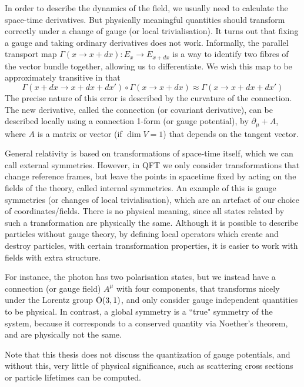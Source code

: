 In order to describe the dynamics of the field, we usually need to calculate the
space-time derivatives. But physically meaningful quantities should transform
correctly under a change of gauge (or local trivialisation). It turns out that 
fixing a gauge and taking ordinary derivatives does not work. Informally, the parallel
transport map $\Gamma(x\to x+dx) : E_x \to E_{x+dx}$ is a way to identify two
fibres of the vector bundle together, allowing us to differentiate. 
We wish this map to be approximately transitive in that 
\[
\Gamma(x+dx \to x+dx+dx') \circ \Gamma(x\to x+dx) \approx \Gamma(x\to x+dx+dx')
\] 
The precise nature of this error is described by the curvature of the
connection. The new derivative, called the connection (or covariant derivative), can be 
described locally using a connection 1-form (or gauge potential),
by $\partial_\mu+A$, where
$A$ is a matrix or vector (if $\dim V=1$) that depends on the tangent vector.

General relativity is based on
transformations of space-time itself, which we can call external symmetries.
However, in QFT we only consider transformations that change reference frames, 
but leave the points in spacetime fixed by acting on the fields of the theory, 
called internal symmetries.   
An example of this is gauge symmetries (or changes of local trivialisation),
which are an artefact of our choice of coordinates/fields. There is no
physical meaning, since all states related by such a transformation are
physically the same. 
Although it is possible to describe particles without gauge theory, by defining
local operators which create and destroy particles, with certain transformation
properties, it is easier to work with fields with extra structure.

For instance, the photon has two polarisation states, but we instead have a
connection (or gauge field) $A^{\mu}$ with four components, that transforms 
nicely under the Lorentz group ${\operatorname{O}}(3,1)$, and only consider gauge independent
quantities to be physical. In contrast, a global symmetry is a ``true" symmetry
of the system, because it corresponds to a conserved quantity via Noether's
theorem, and are physically not the same.  

Note that this thesis does not discuss the quantization of gauge potentials, and
without this, very little of physical significance, such as scattering cross
sections or particle lifetimes can be computed. %


